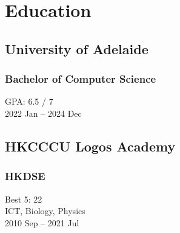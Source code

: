 \documentclass{article}
\begin{document}
\noindent\begin{minipage}{\textwidth}
    \section*{Education}
        \begin{minipage}[t]{0.5\textwidth}
            \subsection*{University of Adelaide}
                \subsubsection*{Bachelor of Computer Science}
                    GPA: 6.5 / 7 \\
                    2022 Jan -- 2024 Dec 
        \end{minipage}%
        \begin{minipage}[t]{0.5\textwidth}
            \subsection*{HKCCCU Logos Academy}
                \subsubsection*{HKDSE} 
                    Best 5: 22 \\
                    ICT, Biology, Physics \\
                    2010 Sep -- 2021 Jul 
        \end{minipage}
\end{minipage}
\vspace{3em}
    
\end{document}
